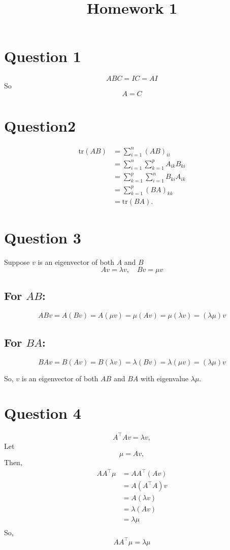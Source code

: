 \documentclass{article}
\title{Homework 1}
\begin{document}
\section*{Question 1}
\[ABC=IC= AI\]
So \[A=C\]
\section*{Question2} 
\begin{align*}
\text{tr}(AB) &= \sum_{i=1}^{n} (AB)_{ii} \\
              &= \sum_{i=1}^{n} \sum_{k=1}^{p} A_{ik} B_{ki} \\
              &= \sum_{k=1}^{p} \sum_{i=1}^{n} B_{ki} A_{ik} \\
              &= \sum_{k=1}^{p} (BA)_{kk} \\
              &= \text{tr}(BA).
\end{align*}

\section*{Question 3}

Suppose \( \mathit{v} \) is an eigenvector of both \( A \) and \( B \)
\[
A \mathit{v} = \lambda \mathit{v}, \quad B \mathit{v} = \mu \mathit{}{v}
\]

\subsection*{For \( AB \):}
\[
AB \mathit{v} = A (B \mathit{v}) = A (\mu \mathit{v}) = \mu (A \mathit{v}) = \mu (\lambda \mathit{v}) = (\lambda \mu) \mathit{v}
\]

\subsection*{For \( BA \):}
\[
BA \mathit{v} = B (A \mathit{v}) = B (\lambda \mathit{v}) = \lambda (B \mathit{v}) = \lambda (\mu \mathit{v}) = (\lambda \mu) \mathit{v}
\]

So, \( \mathit{v} \) is an eigenvector of both \( AB \) and \( BA \) with eigenvalue \( \lambda \mu \).

\section*{Question 4}

   \[ A^\top A v = \lambda v, \]
  Let \[ \mu = Av, \]
 Then,   \begin{align*}
    A A^\top \mu &= A A^\top (Av) \\
    &= A (A^\top A) v \\
    &= A (\lambda v) \\
     &= \lambda (A v) \\
    &= \lambda \mu \\   
\end{align*}
So,  \[A A^\top \mu = \lambda \mu \]
\end{document}
